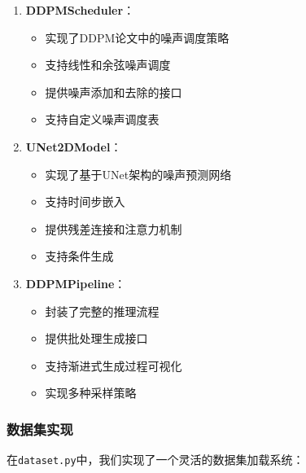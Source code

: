 \documentclass{ctexart}
\begin{document}
\begin{enumerate}
    \item \textbf{DDPMScheduler}：
    \begin{itemize}
        \item 实现了DDPM论文中的噪声调度策略
        \item 支持线性和余弦噪声调度
        \item 提供噪声添加和去除的接口
        \item 支持自定义噪声调度表
    \end{itemize}
    
    \item \textbf{UNet2DModel}：
    \begin{itemize}
        \item 实现了基于UNet架构的噪声预测网络
        \item 支持时间步嵌入
        \item 提供残差连接和注意力机制
        \item 支持条件生成
    \end{itemize}
    
    \item \textbf{DDPMPipeline}：
    \begin{itemize}
        \item 封装了完整的推理流程
        \item 提供批处理生成接口
        \item 支持渐进式生成过程可视化
        \item 实现多种采样策略
    \end{itemize}
\end{enumerate}

\subsubsection{数据集实现}
\noindent
在\texttt{dataset.py}中，我们实现了一个灵活的数据集加载系统：
\end{document}
